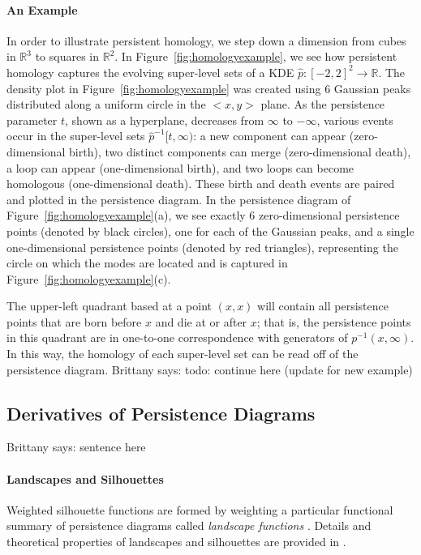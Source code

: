 \documentclass[12pt]{article}
\newcommand{\brittany}[1]{{\color{cyan} Brittany says: #1}}
\newcommand{\figref}[1]{Figure~\ref{#1}}
\def\R{{\mathbb R}}
\begin{document}
\paragraph{An Example}
In order to illustrate persistent homology, we step down a dimension from cubes in $\R^3$ to squares in $\R^2$. In \figref{fig:homologyexample}, we see how persistent homology captures
the evolving super-level sets of a KDE $\widehat{p} \colon [-2,2]^2 \to \R$.  The density plot in \figref{fig:homologyexample} was created using 6 Gaussian peaks distributed along a uniform circle in the $<x,y>$ plane. As the persistence parameter $t$, shown as a hyperplane, decreases from $\infty$ to $-\infty$, various events occur in the
super-level sets $\widehat{p}^{-1}[t,\infty)$: a new component can appear (zero-dimensional birth), two distinct components can merge (zero-dimensional death), a loop can appear (one-dimensional birth), and two loops can become homologous (one-dimensional death).  These birth and death events are paired and plotted in the persistence diagram.
%
In the persistence diagram of \figref{fig:homologyexample}(a), we see exactly 6 zero-dimensional persistence points (denoted by black circles), one for each of the Gaussian peaks, and a single
one-dimensional persistence points (denoted by red triangles), representing the circle on which the modes are located and is captured
in \figref{fig:homologyexample}(c).

The upper-left quadrant based at a point $(x,x)$ will contain all persistence points that are born before $x$ and die at or after $x$; that is, the persistence points in this quadrant are in one-to-one correspondence with generators of $p^{-1}(x,\infty)$.  In this way, the homology of each super-level set can be read off of the persistence diagram.  
\brittany{todo:
continue here (update for new example)}

\subsection{Derivatives of Persistence Diagrams}
\brittany{sentence here}
\paragraph{Landscapes and Silhouettes}
Weighted silhouette functions are formed by weighting a particular functional summary of persistence diagrams called \emph{landscape functions} \cite{bubenik2015statistical}.  Details and theoretical properties of landscapes and silhouettes are provided in \cite{chazal2014stochastic}.
\end{document}
